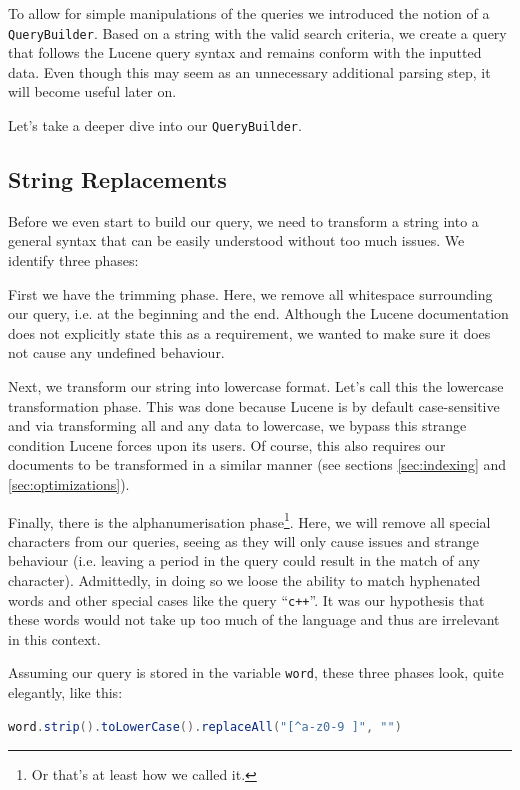 \documentclass[11pt]{article}
\begin{document}
To allow for simple manipulations of the queries we introduced the notion of a \texttt{QueryBuilder}. Based on a string with the valid search criteria, we create a query that follows the Lucene query syntax and remains conform with the inputted data. Even though this may seem as an unnecessary additional parsing step, it will become useful later on.

Let's take a deeper dive into our \texttt{QueryBuilder}.

\subsection{String Replacements}
Before we even start to build our query, we need to transform a string into a general syntax that can be easily understood without too much issues. We identify three phases:

First we have the \textsf{trimming phase}. Here, we remove all whitespace surrounding our query, i.e. at the beginning and the end. Although the Lucene documentation does not explicitly state this as a requirement, we wanted to make sure it does not cause any undefined behaviour.

Next, we transform our string into lowercase format. Let's call this the \textsf{lowercase transformation phase}. This was done because Lucene is by default case-sensitive and via transforming all and any data to lowercase, we bypass this strange condition Lucene forces upon its users. Of course, this also requires our documents to be transformed in a similar manner (see sections \ref{sec:indexing} and \ref{sec:optimizations}).

Finally, there is the \textsf{alphanumerisation phase}\footnote{Or that's at least how we called it.}. Here, we will remove all special characters from our queries, seeing as they will only cause issues and strange behaviour (i.e. leaving a period in the query could result in the match of any character). Admittedly, in doing so we loose the ability to match hyphenated words and other special cases like the query ``\texttt{c++}''. It was our hypothesis that these words would not take up too much of the language and thus are irrelevant in this context.

Assuming our query is stored in the variable \texttt{word}, these three phases look, quite elegantly, like this:
\begin{lstlisting}[language=Java]
word.strip().toLowerCase().replaceAll("[^a-z0-9 ]", "")
\end{lstlisting}
\end{document}
